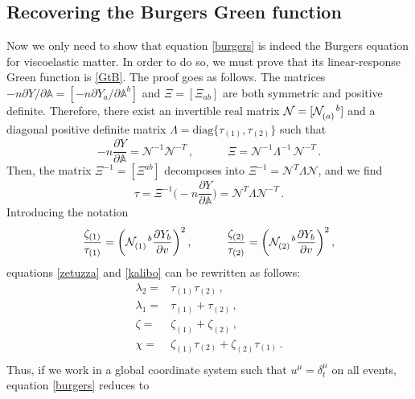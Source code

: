 \documentclass[a4paper, amsfonts, amssymb, amsmath, reprint, showkeys, nofootinbib, twoside, onecolumn,notitlepage]{revtex4-1}
\newcommand{\spc}{\quad \quad \quad}
\begin{document}
\subsection{Recovering the Burgers Green function}


Now we only need to show that equation \eqref{burgers} is indeed the Burgers equation for viscoelastic matter. In order to do so, we must prove that its linear-response Green function is \eqref{GtB}. The proof goes as follows. 
The matrices $-n\partial Y /\partial \mathbb{A}= [-n\partial Y_a/\partial \mathbb{A}^b]$ and $\Xi=[\Xi_{ab}]$ are both symmetric and positive definite. Therefore, there exist an invertible real matrix $\mathcal{N}=[\mathcal{N}\indices{_{(a)} ^b}]$ and a diagonal positive definite matrix $\Lambda=\text{diag}\{\tau_{(1)},\tau_{(2)}\}$ such that \cite{horn_johnson_1985}
\begin{equation}
{-}n \dfrac{\partial Y}{\partial \mathbb{A}} = \mathcal{N}^{-1}\mathcal{N}^{-T} \, , \spc \Xi = \mathcal{N}^{-1} \Lambda^{-1} \,\mathcal{N}^{-T} \, .
\end{equation}
Then, the matrix $\Xi^{-1}=[\Xi^{ab}]$ decomposes into $\Xi^{-1}=\mathcal{N}^{T} \Lambda\mathcal{N}$, and we find
\begin{equation}
\tau = \Xi^{-1} \bigg({-}n \dfrac{\partial Y}{\partial \mathbb{A}} \bigg) = \mathcal{N}^T \Lambda \mathcal{N}^{-T} \, .
\end{equation}
Introducing the notation
\begin{equation}
\dfrac{\zeta_{(1)}}{\tau_{(1)}} = \bigg( \mathcal{N}\indices{_{(1)} ^b} \dfrac{\partial Y_b}{\partial v} \bigg)^2 \, , \spc \dfrac{\zeta_{(2)}}{\tau_{(2)}} = \bigg( \mathcal{N}\indices{_{(2)} ^b} \dfrac{\partial Y_b}{\partial v} \bigg)^2 \, , 
\end{equation}
equations \eqref{zetuzza} and \eqref{kalibo} can be rewritten as follows:
\begin{equation}\label{xemo}
\begin{split}
\lambda_2 ={}& \tau_{(1)}\tau_{(2)} \, , \\
\lambda_1 ={}& \tau_{(1)}+\tau_{(2)} \, , \\
\zeta ={}& \zeta_{(1)}+\zeta_{(2)} \, , \\
\chi ={}& \zeta_{(1)}\tau_{(2)}+\zeta_{(2)}\tau_{(1)} \, . \\
\end{split}
\end{equation}
Thus, if we work in a global coordinate system such that $u^\mu=\delta^\mu_t$ on all events, equation \eqref{burgers} reduces to
\end{document}
